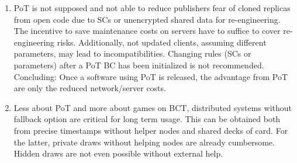 \begin{enumerate}
	\item \gls{PoT} is not supposed and not able to reduce publishers fear of cloned replicas from open code due to \gls{SC}s or unencrypted shared data for re-engineering.
	The incentive to save maintenance costs on servers have to suffice to cover re-engineering risks.
	Additionally, not updated clients, assuming different parameters, may lead to incompatibilities.
	Changing rules (\gls{SC}s or parameters) after a \gls{PoT} \gls{BC} has been initialized is not recommended.
	Concluding: Once a software using \gls{PoT} is released, the advantage from \gls{PoT} are only the reduced network/server costs.
	
	\item Less about \gls{PoT} and more about games on \gls{BCT}, distributed systems without fallback option are critical for long term usage.
	This can be obtained both from precise timestamps without helper nodes and shared decks of card.
	For the latter, private draws without helping nodes are already cumbersome.
	Hidden draws are not even possible without external help.
	
\end{enumerate}

